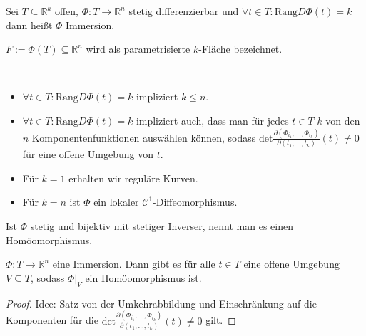 \begin{definition}[Immersion]
	Sei $T\subseteq \mathbb R^k$ offen, $\Phi:T\rightarrow \mathbb R^n$ stetig differenzierbar und $\forall t\in T: \text{Rang}D\Phi(t)=k$ dann hei\ss t $\Phi$ Immersion.
\end{definition}
\begin{definition}[k-Fl\"achen]
	$F:=\Phi(T)\subseteq \mathbb R^n$ wird als parametrisierte $k$-Fl\"ache bezeichnet.
\end{definition}

\begin{remark}\_\newline
	\begin{itemize}
		\item $\forall t\in T: \text{Rang}D\Phi(t)=k$ impliziert $k\leq n$.
		\item $\forall t\in T: \text{Rang}D\Phi(t)=k$ impliziert auch, dass man f\"ur jedes $t\in T$ $k$ von den $n$ Komponentenfunktionen ausw\"ahlen k\"onnen, sodass $\text{det}\frac{\partial(\Phi_{i_1},\dots,\Phi_{i_k})}{\partial(t_1,\dots,t_k)}(t)\neq 0$ f\"ur eine offene Umgebung von $t$.
		\item F\"ur $k=1$ erhalten wir regul\"are Kurven.
		\item F\"ur $k=n$ ist $\Phi$ ein lokaler $\mathcal C^1$-Diffeomorphismus.
	\end{itemize}
\end{remark}
\begin{definition}
	Ist $\Phi$ stetig und bijektiv mit stetiger Inverser, nennt man es einen Hom\"oomorphismus.
\end{definition}

\begin{lemma}
	$\Phi:T \rightarrow \mathbb R^n$ eine Immersion. Dann gibt es f\"ur alle $t\in T$ eine offene Umgebung $V \subseteq T$, sodass $\Phi|_V$ ein Hom\"oomorphismus ist.
\end{lemma}
\begin{proof}
	Idee: Satz von der Umkehrabbildung und Einschr\"ankung auf die Komponenten f\"ur die $\text{det}\frac{\partial(\Phi_{i_1},\dots,\Phi_{i_k})}{\partial(t_1,\dots,t_k)}(t)\neq 0$ gilt.
\end{proof}



